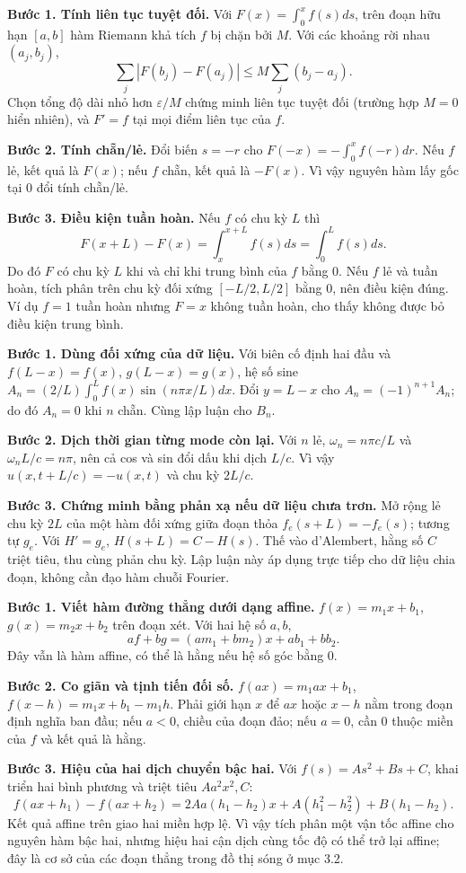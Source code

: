 \textbf{Bước 1. Tính liên tục tuyệt đối.} Với $F(x)=\int_0^xf(s)ds$, trên đoạn hữu hạn $[a,b]$ hàm Riemann khả tích $f$ bị chặn bởi $M$. Với các khoảng rời nhau $(a_j,b_j)$,
\[\sum_j|F(b_j)-F(a_j)|\le M\sum_j(b_j-a_j).\]
Chọn tổng độ dài nhỏ hơn $\varepsilon/M$ chứng minh liên tục tuyệt đối (trường hợp $M=0$ hiển nhiên), và $F'=f$ tại mọi điểm liên tục của $f$.

\textbf{Bước 2. Tính chẵn/lẻ.} Đổi biến $s=-r$ cho $F(-x)=-\int_0^xf(-r)dr$. Nếu $f$ lẻ, kết quả là $F(x)$; nếu $f$ chẵn, kết quả là $-F(x)$. Vì vậy nguyên hàm lấy gốc tại $0$ đổi tính chẵn/lẻ.

\textbf{Bước 3. Điều kiện tuần hoàn.} Nếu $f$ có chu kỳ $L$ thì
\[F(x+L)-F(x)=\int_x^{x+L}f(s)ds=\int_0^Lf(s)ds.\]
Do đó $F$ có chu kỳ $L$ khi và chỉ khi trung bình của $f$ bằng $0$. Nếu $f$ lẻ và tuần hoàn, tích phân trên chu kỳ đối xứng $[-L/2,L/2]$ bằng $0$, nên điều kiện đúng. Ví dụ $f=1$ tuần hoàn nhưng $F=x$ không tuần hoàn, cho thấy không được bỏ điều kiện trung bình.

\textbf{Bước 1. Dùng đối xứng của dữ liệu.} Với biên cố định hai đầu và $f(L-x)=f(x)$, $g(L-x)=g(x)$, hệ số sine $A_n=(2/L)\int_0^Lf(x)\sin(n\pi x/L)dx$. Đổi $y=L-x$ cho $A_n=(-1)^{n+1}A_n$; do đó $A_n=0$ khi $n$ chẵn. Cùng lập luận cho $B_n$.

\textbf{Bước 2. Dịch thời gian từng mode còn lại.} Với $n$ lẻ, $\omega_n=n\pi c/L$ và $\omega_nL/c=n\pi$, nên cả cos và sin đổi dấu khi dịch $L/c$. Vì vậy $u(x,t+L/c)=-u(x,t)$ và chu kỳ $2L/c$.

\textbf{Bước 3. Chứng minh bằng phản xạ nếu dữ liệu chưa trơn.} Mở rộng lẻ chu kỳ $2L$ của một hàm đối xứng giữa đoạn thỏa $f_e(s+L)=-f_e(s)$; tương tự $g_e$. Với $H'=g_e$, $H(s+L)=C-H(s)$. Thế vào d'Alembert, hằng số $C$ triệt tiêu, thu cùng phản chu kỳ. Lập luận này áp dụng trực tiếp cho dữ liệu chia đoạn, không cần đạo hàm chuỗi Fourier.

\textbf{Bước 1. Viết hàm đường thẳng dưới dạng affine.} $f(x)=m_1x+b_1$, $g(x)=m_2x+b_2$ trên đoạn xét. Với hai hệ số $a,b$,
\[af+bg=(am_1+bm_2)x+ab_1+bb_2.\]
Đây vẫn là hàm affine, có thể là hằng nếu hệ số góc bằng $0$.

\textbf{Bước 2. Co giãn và tịnh tiến đối số.} $f(ax)=m_1ax+b_1$, $f(x-h)=m_1x+b_1-m_1h$. Phải giới hạn $x$ để $ax$ hoặc $x-h$ nằm trong đoạn định nghĩa ban đầu; nếu $a<0$, chiều của đoạn đảo; nếu $a=0$, cần $0$ thuộc miền của $f$ và kết quả là hằng.

\textbf{Bước 3. Hiệu của hai dịch chuyển bậc hai.} Với $f(s)=As^2+Bs+C$, khai triển hai bình phương và triệt tiêu $Aa^2x^2,C$:
\[f(ax+h_1)-f(ax+h_2)=2Aa(h_1-h_2)x+A(h_1^2-h_2^2)+B(h_1-h_2).\]
Kết quả affine trên giao hai miền hợp lệ. Vì vậy tích phân một vận tốc affine cho nguyên hàm bậc hai, nhưng hiệu hai cận dịch cùng tốc độ có thể trở lại affine; đây là cơ sở của các đoạn thẳng trong đồ thị sóng ở mục 3.2.

